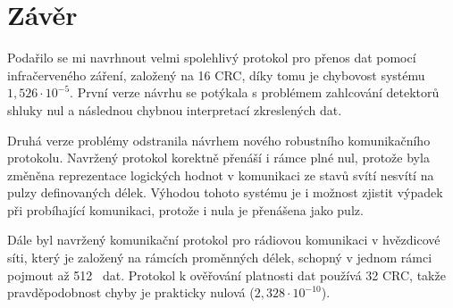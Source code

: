 \chapter{Závěr}

Podařilo se mi navrhnout velmi spolehlivý protokol pro přenos dat pomocí infračerveného záření, založený na 16 CRC, díky tomu je chybovost systému $1,526 \cdot 10^{-5}$. První verze návrhu se potýkala s problémem zahlcování detektorů shluky nul a následnou chybnou interpretací zkreslených dat.

Druhá verze problémy odstranila návrhem nového robustního komunikačního protokolu. Navržený protokol korektně přenáší i rámce plné nul, protože byla změněna reprezentace logických hodnot v komunikaci ze stavů svítí nesvítí na pulzy definovaných délek. Výhodou tohoto systému je i možnost zjistit výpadek při probíhající komunikaci, protože i nula je přenášena jako pulz.

Dále byl navržený komunikační protokol pro rádiovou komunikaci v hvězdicové síti, který je založený na rámcích proměnných délek, schopný v jednom rámci pojmout až 512~ dat. Protokol k ověřování platnosti dat používá 32 CRC, takže pravděpodobnost chyby je prakticky nulová ($2,328 \cdot 10^{-10}$).
